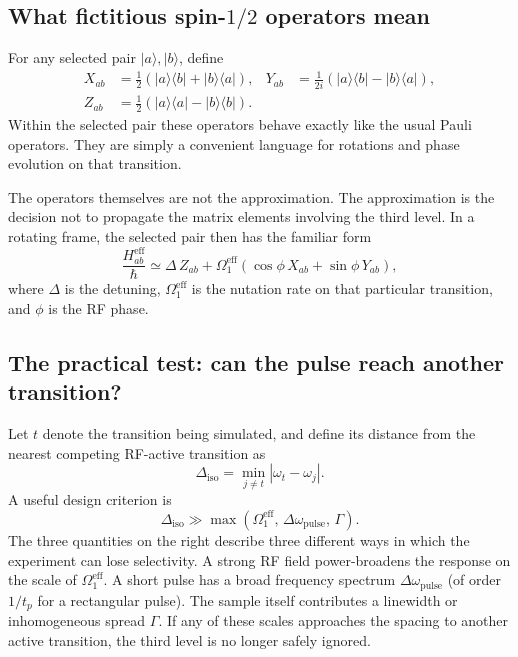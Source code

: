 \documentclass[11pt,letterpaper]{article}
\newcommand{\ket}[1]{\lvert #1\rangle}
\newcommand{\dyad}[2]{\lvert #1\rangle\!\langle #2\rvert}
\begin{document}
\subsection{What fictitious spin-$1/2$ operators mean}

For any selected pair $\ket a,\ket b$, define
\begin{align}
X_{ab}&=\tfrac12(\dyad a b+\dyad b a),
&Y_{ab}&=\tfrac1{2i}(\dyad a b-\dyad b a),\\
Z_{ab}&=\tfrac12(\dyad a a-\dyad b b).
\end{align}
Within the selected pair these operators behave exactly like the usual Pauli operators. They are simply a convenient language for rotations and phase evolution on that transition.\cite{vega1978}

The operators themselves are not the approximation. The approximation is the decision not to propagate the matrix elements involving the third level. In a rotating frame, the selected pair then has the familiar form
\begin{equation}
\frac{H_{ab}^{\mathrm{eff}}}{\hbar}
\simeq \Delta\,Z_{ab}
+\Omega_1^{\mathrm{eff}}
\left(\cos\phi\,X_{ab}+\sin\phi\,Y_{ab}\right),
\end{equation}
where $\Delta$ is the detuning, $\Omega_1^{\mathrm{eff}}$ is the nutation rate on that particular transition, and $\phi$ is the RF phase.

\subsection{The practical test: can the pulse reach another transition?}

Let $t$ denote the transition being simulated, and define its distance from the nearest competing RF-active transition as
\begin{equation}
\Delta_{\mathrm{iso}}=\min_{j\neq t}|\omega_t-\omega_j|.
\label{eq:deltaiso}
\end{equation}
A useful design criterion is
\begin{equation}
\Delta_{\mathrm{iso}}\gg
\max\!\left(\Omega_1^{\mathrm{eff}},\,\Delta\omega_{\mathrm{pulse}},\,\Gamma\right).
\label{eq:isolation}
\end{equation}
The three quantities on the right describe three different ways in which the experiment can lose selectivity. A strong RF field power-broadens the response on the scale of $\Omega_1^{\mathrm{eff}}$. A short pulse has a broad frequency spectrum $\Delta\omega_{\mathrm{pulse}}$ (of order $1/t_p$ for a rectangular pulse). The sample itself contributes a linewidth or inhomogeneous spread $\Gamma$. If any of these scales approaches the spacing to another active transition, the third level is no longer safely ignored.
\end{document}
